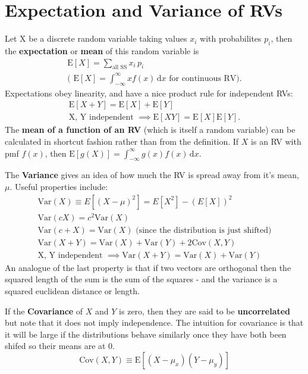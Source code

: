 \section{Expectation and Variance of RVs}
Let X be a discrete random variable taking values $x_i$ with probabilites $p_i$, then the \textbf{expectation} or \textbf{mean} of this random variable is 
\begin{align}
\mathrm{E} [X]=\sum _{\text{all SS}}x_{i}\,p_{i} \\
\text{( }\mathrm{E} [X]=\int _{-\infty }^{\infty }xf(x)\,\mathrm {d} x \text{ for continuous RV).}
\end{align}
Expectations obey linearity, and have a nice product rule for independent RVs:
\begin{align}
\mathrm {E}[X+Y] = \mathrm{E}[X] + \mathrm{E}[Y]\\
\text{X, Y independent }\implies \mathrm {E}[XY] = \mathrm{E}[X]\mathrm{E}[Y].
\end{align}
The \textbf{mean of a function of an RV} (which is itself a random variable) can be calculated in shortcut fashion rather than from the definition. If $X$ is an RV with pmf $f(x)$, then $\mathrm {E} [g(X)]=\int _{-\infty }^{\infty }g(x)f(x)\,\mathrm {d} x.$
\nn


The \textbf{Variance} gives an idea of how much the RV is spread away from it's mean, $\mu$. Useful properties include:
\begin{align}
\mathrm{Var}(X) \equiv E[(X-\mu)^2] = E[X^2]-(E[X])^2\\
\mathrm{Var}(cX) = c^2\mathrm{Var}(X)\\
\mathrm{Var}(c+X) = \mathrm{Var}(X) \text{  (since the distribution is just shifted)}\\
\mathrm{Var}(X +Y) = \mathrm{Var}(X) + \mathrm{Var}(Y) + 2 \mathrm{Cov}(X,Y)\\
\text{X, Y independent }\implies \mathrm{Var}(X +Y) = \mathrm{Var}(X) + \mathrm{Var}(Y)
\end{align}
An analogue of the last property is that if two vectors are orthogonal then the squared length of the sum is the sum of the squares - and the variance is a squared euclidean distance or length. 
\nn

If the \textbf{Covariance} of $X$ and $Y$ is zero, then they are said to be \textbf{uncorrelated} but note that it does not imply independence. The intuition for covariance is that it will be large if the distributions behave similarly once they have both been shifed so their means are at 0.
\begin{equation}
\mathrm{Cov}(X,Y) \equiv \mathrm{E}[(X-\mu_x)(Y-\mu_y)]
\end{equation}
\nn

